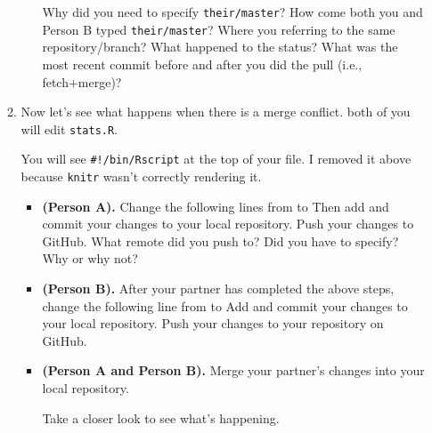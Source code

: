 \documentclass{article}
\begin{document}
\begin{enumerate}
\begin{enumerate}
\begin{itemize}
Why did you need to specify \texttt{their/master}?  How come both you and
Person B typed \texttt{their/master}? Where you referring to the same
repository/branch? What happened to the status?  What was the most recent
commit before and after you did the pull (i.e., fetch+merge)?
\end{itemize}

\item Now let's see what happens when there is a merge conflict.
 both of you will edit \texttt{stats.R}.

%
%

You will see \texttt{\#!/bin/Rscript} at the top of your file.  I removed
it above because \texttt{knitr} wasn't correctly rendering it.

\begin{itemize}
\item \textbf{(Person A).} Change the following lines from
to
Then add and commit your changes to your local repository.  Push your changes to
GitHub.  What remote did you push to?  Did you have to specify?  Why or why not?

\item \textbf{(Person B).}  After your partner has completed the above steps,
change the following line from
to
Add and commit your changes to your local repository.  Push your changes to
your repository on GitHub.

\item \textbf{(Person A and Person B).} Merge your partner's changes into your
local repository.


Take a closer look to see what's happening.
%
%
%
%


\end{itemize}
\end{enumerate}
\end{enumerate}
\end{document}

